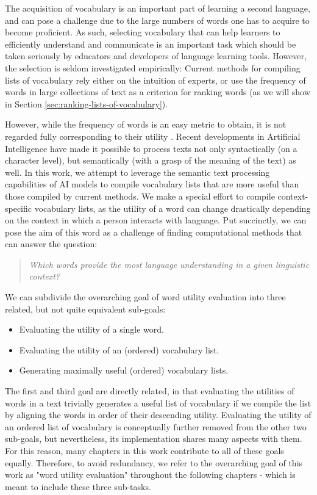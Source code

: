 The acquisition of vocabulary is an important part of learning a second language, and can pose a challenge due to the large numbers of words one has to acquire to become proficient.
As such, selecting vocabulary that can help learners to efficiently understand and communicate is an important task which should be taken seriously by educators and developers of language learning tools.
However, the selection is seldom investigated empirically:
Current methods for compiling lists of vocabulary rely either on the intuition of experts, or use the frequency of words in large collections of text as a criterion for ranking words (as we will show in Section \ref{sec:ranking-lists-of-vocabulary}).

However, while the frequency of words is an easy metric to obtain, it is not regarded fully corresponding to their utility \cite{liRoutledgeHandbookSecond2022}.
Recent developments in Artificial Intelligence have made it possible to process texts not only syntactically (on a character level), but semantically (with a grasp of the meaning of the text) as well.
In this work, we attempt to leverage the semantic text processing capabilities of AI models to compile vocabulary lists that are more useful than those compiled by current methods.
We make a special effort to compile context-specific vocabulary lists, as the utility of a word can change drastically depending on the context in which a person interacts with language.
Put succinctly, we can pose the aim of this word as a challenge of finding computational methods that can answer the question:

\begin{quote}
	\textit{Which words provide the most language understanding in a given linguistic context?}
\end{quote}

We can subdivide the overarching goal of word utility evaluation into three related, but not quite equivalent sub-goals:
\begin{itemize}
	\item Evaluating the utility of a single word.
	\item Evaluating the utility of an (ordered) vocabulary list.
	\item Generating maximally useful (ordered) vocabulary lists.
\end{itemize}

The first and third goal are directly related, in that evaluating the utilities of words in a text trivially generates a useful list of vocabulary if we compile the list by aligning the words in order of their descending utility. 
Evaluating the utility of an ordered list of vocabulary is conceptually further removed from the other two sub-goals, but nevertheless, its implementation shares many aspects with them.
For this reason, many chapters in this work contribute to all of these goals equally.
Therefore, to avoid redundancy, we refer to the overarching goal of this work as "word utility evaluation" throughout the following chapters - which is meant to include these three sub-tasks.

